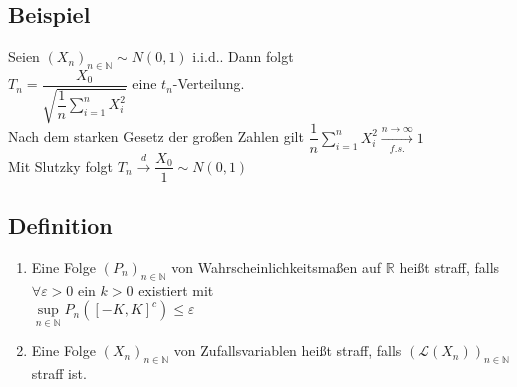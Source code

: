 \documentclass[german,10pt,oneside, fleqn, a4paper]{article}
\newcommand {\R}	{\mathbb{R}}
\newcommand {\N}	{\mathbb{N}}
\newcommand{\sm}[2][\infty]{\sum\limits_{#2}^{#1}}
\newcommand{\folge}[3][\N]{\left(#2_#3\right)_{#3\in #1}}
\newcommand{\mc}[1]{\mathcal{#1}}
\newcommand{\toinf}{\rightarrow\infty}
\newcommand{\1}[1]{1_{#1}}
\newcommand{\2}[1]{\1{\brac{#1}}}
\newcommand{\xr}[2][]{\xrightarrow[#1]{#2}}
\begin{document}
\subsection{Beispiel}
\label{3.13}
Seien $\folge{X}{n}\sim N(0,1)$ i.i.d.. Dann folgt\\
$T_n=\dfrac{X_0}{\sqrt{\dfrac{1}{n}\sm[n]{i=1}X_i^2}}$ eine $t_n$-Verteilung.\\
Nach dem starken Gesetz der großen Zahlen gilt $\dfrac{1}{n}\sm[n]{i=1}X_i^2\xr[f.s.]{n\toinf}1$\\
Mit Slutzky folgt $T_n\xr{d}\dfrac{X_0}{1}\sim N(0,1)$

\subsection{Definition}
\label{3.14}
\begin{enumerate}[label=(\alph*)]
\item Eine Folge $\folge{P}{n}$ von Wahrscheinlichkeitsmaßen auf $\R$ heißt straff, falls $\forall\varepsilon>0$ ein $k>0$ existiert mit\\
$\sup\limits_{n\in\N}P_n([-K,K]^c)\leq\varepsilon$
\item Eine Folge $\folge{X}{n}$ von Zufallsvariablen heißt straff, falls $(\mc{L}(X_n))_{n\in\N}$ straff ist.
\end{enumerate}
\end{document}
